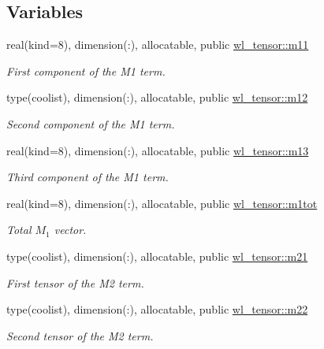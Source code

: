 \subsection*{Variables}
\begin{DoxyCompactItemize}
\item 
real(kind=8), dimension(\+:), allocatable, public \hyperlink{namespacewl__tensor_ac43c10a8ee5e3dd488001634e715b0ae}{wl\+\_\+tensor\+::m11}
\begin{DoxyCompactList}\small\item\em First component of the M1 term. \end{DoxyCompactList}\item 
type(coolist), dimension(\+:), allocatable, public \hyperlink{namespacewl__tensor_a2c742f8ab1b1994e6a82a04c602d7ca9}{wl\+\_\+tensor\+::m12}
\begin{DoxyCompactList}\small\item\em Second component of the M1 term. \end{DoxyCompactList}\item 
real(kind=8), dimension(\+:), allocatable, public \hyperlink{namespacewl__tensor_a3fd6e00295fde7edb66a55b18d3baa64}{wl\+\_\+tensor\+::m13}
\begin{DoxyCompactList}\small\item\em Third component of the M1 term. \end{DoxyCompactList}\item 
real(kind=8), dimension(\+:), allocatable, public \hyperlink{namespacewl__tensor_ac442e2b63d99baccc3cac2abd49c86ca}{wl\+\_\+tensor\+::m1tot}
\begin{DoxyCompactList}\small\item\em Total $M_1$ vector. \end{DoxyCompactList}\item 
type(coolist), dimension(\+:), allocatable, public \hyperlink{namespacewl__tensor_a58f60ce371ac407b5f7596b8976b52a7}{wl\+\_\+tensor\+::m21}
\begin{DoxyCompactList}\small\item\em First tensor of the M2 term. \end{DoxyCompactList}\item 
type(coolist), dimension(\+:), allocatable, public \hyperlink{namespacewl__tensor_a952b70ac574c64607a710bd62962d49d}{wl\+\_\+tensor\+::m22}
\begin{DoxyCompactList}\small\item\em Second tensor of the M2 term. \end{DoxyCompactList}\item 

\end{DoxyCompactItemize}
